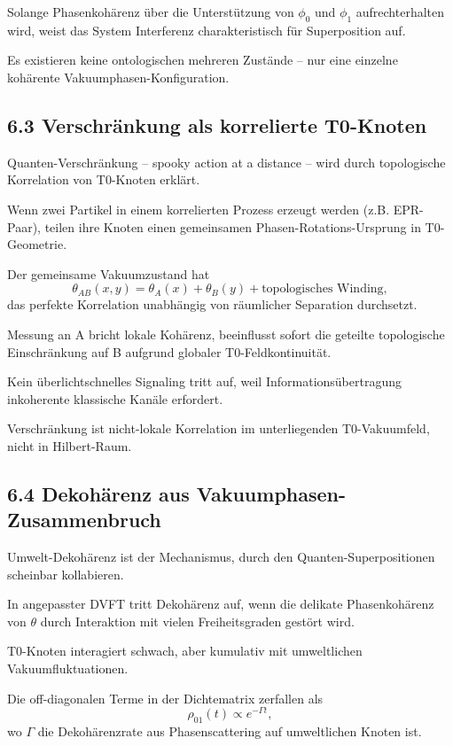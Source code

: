 	Solange Phasenkohärenz über die Unterstützung von $\phi_0$ und $\phi_1$ aufrechterhalten wird, weist das System Interferenz charakteristisch für Superposition auf.
	
	Es existieren keine ontologischen mehreren Zustände – nur eine einzelne kohärente Vakuumphasen-Konfiguration.
	
	\subsection{6.3 Verschränkung als korrelierte T0-Knoten}
	
	Quanten-Verschränkung – spooky action at a distance – wird durch topologische Korrelation von T0-Knoten erklärt.
	
	Wenn zwei Partikel in einem korrelierten Prozess erzeugt werden (z.B. EPR-Paar), teilen ihre Knoten einen gemeinsamen Phasen-Rotations-Ursprung in T0-Geometrie.
	
	Der gemeinsame Vakuumzustand hat
	\[
	\theta_{AB}(x,y) = \theta_A(x) + \theta_B(y) + \text{topologisches Winding},
	\]
	das perfekte Korrelation unabhängig von räumlicher Separation durchsetzt.
	
	Messung an A bricht lokale Kohärenz, beeinflusst sofort die geteilte topologische Einschränkung auf B aufgrund globaler T0-Feldkontinuität.
	
	Kein überlichtschnelles Signaling tritt auf, weil Informationsübertragung inkoherente klassische Kanäle erfordert.
	
	Verschränkung ist nicht-lokale Korrelation im unterliegenden T0-Vakuumfeld, nicht in Hilbert-Raum.
	
	\subsection{6.4 Dekohärenz aus Vakuumphasen-Zusammenbruch}
	
	Umwelt-Dekohärenz ist der Mechanismus, durch den Quanten-Superpositionen scheinbar kollabieren.
	
	In angepasster DVFT tritt Dekohärenz auf, wenn die delikate Phasenkohärenz von $\theta$ durch Interaktion mit vielen Freiheitsgraden gestört wird.
	
	T0-Knoten interagiert schwach, aber kumulativ mit umweltlichen Vakuumfluktuationen.
	
	Die off-diagonalen Terme in der Dichtematrix zerfallen als
	\[
	\rho_{01}(t) \propto e^{-\Gamma t},
	\]
	wo $\Gamma$ die Dekohärenzrate aus Phasenscattering auf umweltlichen Knoten ist.
	
